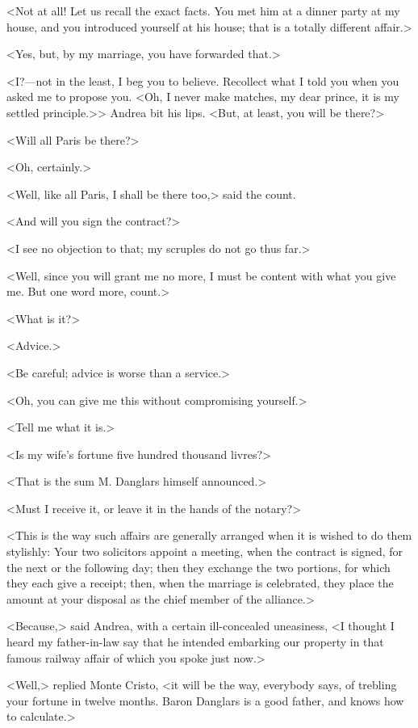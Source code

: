  <Not at all! Let us recall the exact facts. You met him at a dinner party at my house, and you introduced yourself at his house; that is a totally different affair.> 

 <Yes, but, by my marriage, you have forwarded that.> 

 <I?—not in the least, I beg you to believe. Recollect what I told you when you asked me to propose you. <Oh, I never make matches, my dear prince, it is my settled principle.>> Andrea bit his lips.  <But, at least, you will be there?> 

 <Will all Paris be there?> 

 <Oh, certainly.> 

 <Well, like all Paris, I shall be there too,> said the count. 

 <And will you sign the contract?> 

 <I see no objection to that; my scruples do not go thus far.> 

 <Well, since you will grant me no more, I must be content with what you give me. But one word more, count.> 

 <What is it?> 

 <Advice.> 

 <Be careful; advice is worse than a service.> 

 <Oh, you can give me this without compromising yourself.> 

 <Tell me what it is.> 

 <Is my wife's fortune five hundred thousand livres?> 

 <That is the sum M. Danglars himself announced.> 

 <Must I receive it, or leave it in the hands of the notary?> 

 <This is the way such affairs are generally arranged when it is wished to do them stylishly: Your two solicitors appoint a meeting, when the contract is signed, for the next or the following day; then they exchange the two portions, for which they each give a receipt; then, when the marriage is celebrated, they place the amount at your disposal as the chief member of the alliance.> 

 <Because,> said Andrea, with a certain ill-concealed uneasiness, <I thought I heard my father-in-law say that he intended embarking our property in that famous railway affair of which you spoke just now.> 

 <Well,> replied Monte Cristo, <it will be the way, everybody says, of trebling your fortune in twelve months. Baron Danglars is a good father, and knows how to calculate.> 

